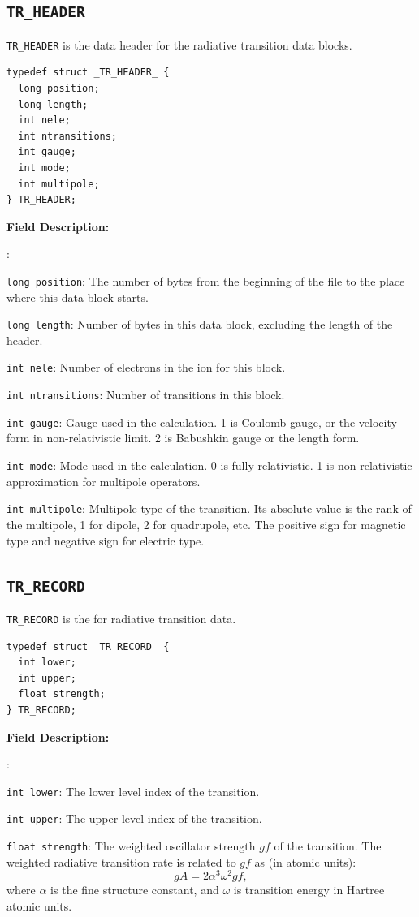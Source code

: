 \documentclass[twoside,letterpaper]{refrep}
\newenvironment{dbdesc}{\textbf{Field Description:} \begin{list}
	{:}{\setlength{\labelwidth}{2in}
	   \setlength{\leftmargin}{2in}
	   \setlength{\labelsep}{0.1in}
	   \setlength{\rightmargin}{0.2in}}}
	{\end{list}}
\begin{document}
\subsection{\texttt{TR\_HEADER}}
\texttt{TR\_HEADER} is the data header for the radiative transition data
blocks. 

\begin{verbatim}
typedef struct _TR_HEADER_ {
  long position;
  long length;
  int nele;
  int ntransitions;
  int gauge;
  int mode;
  int multipole;
} TR_HEADER;
\end{verbatim}

\begin{dbdesc}
\item[\texttt{long position}:] The number of bytes from the beginning of the
file to the place where this data block starts.
\item[\texttt{long length}:] Number of bytes in this data block, excluding the
length of the header.
\item[\texttt{int nele}:] Number of electrons in the ion for this block.
\item[\texttt{int ntransitions}:] Number of transitions in this block.
\item[\texttt{int gauge}:] Gauge used in the calculation. 1 is Coulomb gauge, or
the velocity form in non-relativistic limit. 2 is Babushkin gauge or the
length form.
\item[\texttt{int mode}:] Mode used in the calculation. 0 is fully
relativistic. 1 is non-relativistic approximation for multipole operators.
\item[\texttt{int multipole}:] Multipole type of the transition. Its absolute
value is the rank of the multipole, 1 for dipole, 2 for quadrupole, etc. The
positive sign for magnetic type and negative sign for electric type.
\end{dbdesc}

\subsection{\texttt{TR\_RECORD}}
\texttt{TR\_RECORD} is the for radiative transition data.

\begin{verbatim}
typedef struct _TR_RECORD_ {
  int lower;
  int upper;
  float strength;
} TR_RECORD;
\end{verbatim}

\begin{dbdesc}
\item[\texttt{int lower}:] The lower level index of the transition.
\item[\texttt{int upper}:] The upper level index of the transition.
\item[\texttt{float strength}:] The weighted oscillator strength $gf$ of the
transition. The weighted radiative transition rate is related to $gf$ as (in
atomic units):
\begin{equation}
gA = 2\alpha^3 \omega^2 gf,
\end{equation}
where $\alpha$ is the fine structure constant, and $\omega$ is transition
energy in Hartree atomic units. 

\end{dbdesc}
\end{document}
